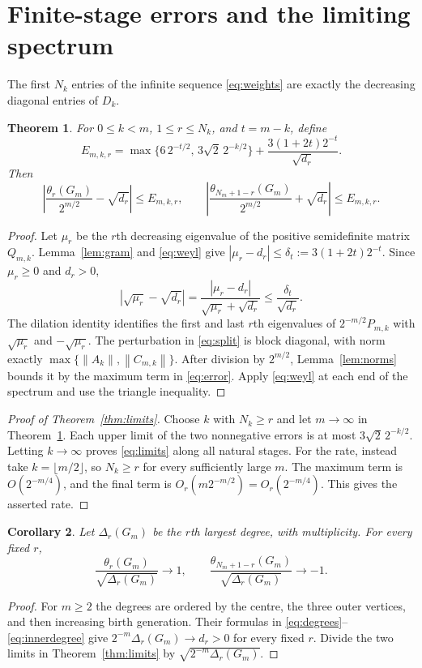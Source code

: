 \documentclass[11pt]{article}
\newtheorem{theorem}{Theorem}
\newtheorem{corollary}[theorem]{Corollary}
\newcommand{\norm}[1]{\left\lVert#1\right\rVert}
\begin{document}
\section{Finite-stage errors and the limiting spectrum}
The first $N_k$ entries of the infinite sequence \eqref{eq:weights}
are exactly the decreasing diagonal entries of $D_k$.

\begin{theorem}\label{thm:error}
For $0\le k<m$, $1\le r\le N_k$, and $t=m-k$, define
\begin{equation}\label{eq:error}
E_{m,k,r}=\max\{6\,2^{-t/2},\,3\sqrt2\,2^{-k/2}\}
+\frac{3(1+2t)2^{-t}}{\sqrt{d_r}}.
\end{equation}
Then
\[
\left|\frac{\theta_r(G_m)}{2^{m/2}}-\sqrt{d_r}\right|\le E_{m,k,r},
\qquad
\left|\frac{\theta_{N_m+1-r}(G_m)}{2^{m/2}}+\sqrt{d_r}\right|
\le E_{m,k,r}.
\]
\end{theorem}
\begin{proof}
Let $\mu_r$ be the $r$th decreasing eigenvalue of the positive
semidefinite matrix $Q_{m,k}$. Lemma~\ref{lem:gram} and
\eqref{eq:weyl} give
$|\mu_r-d_r|\le\delta_t:=3(1+2t)2^{-t}$.
Since $\mu_r\ge0$ and $d_r>0$,
\[
|\sqrt{\mu_r}-\sqrt{d_r}|
=\frac{|\mu_r-d_r|}{\sqrt{\mu_r}+\sqrt{d_r}}
\le\frac{\delta_t}{\sqrt{d_r}}.
\]
The dilation identity identifies the first and last $r$th eigenvalues
of $2^{-m/2}P_{m,k}$ with $\sqrt{\mu_r}$ and $-\sqrt{\mu_r}$.
The perturbation in \eqref{eq:split} is block diagonal, with norm
exactly $\max\{\norm{A_k},\norm{C_{m,k}}\}$.
After division by $2^{m/2}$, Lemma~\ref{lem:norms} bounds it by the
maximum term in \eqref{eq:error}. Apply \eqref{eq:weyl} at each
end of the spectrum and use the triangle inequality.
\end{proof}

\begin{proof}[Proof of Theorem~\ref{thm:limits}]
Choose $k$ with $N_k\ge r$ and let $m\to\infty$ in
Theorem~\ref{thm:error}. Each upper limit of the two nonnegative
errors is at most $3\sqrt2\,2^{-k/2}$. Letting $k\to\infty$
proves \eqref{eq:limits} along all natural stages.
For the rate, instead take $k=\lfloor m/2\rfloor$, so $N_k\ge r$
for every sufficiently large $m$. The maximum term is
$O(2^{-m/4})$, and the final term is
$O_r(m2^{-m/2})=O_r(2^{-m/4})$. This gives the asserted rate.
\end{proof}

\begin{corollary}\label{cor:degrees}
Let $\Delta_r(G_m)$ be the $r$th largest degree, with multiplicity.
For every fixed $r$,
\[
\frac{\theta_r(G_m)}{\sqrt{\Delta_r(G_m)}}\longrightarrow1,
\qquad
\frac{\theta_{N_m+1-r}(G_m)}{\sqrt{\Delta_r(G_m)}}\longrightarrow-1.
\]
\end{corollary}
\begin{proof}
For $m\ge2$ the degrees are ordered by the centre, the three outer
vertices, and then increasing birth generation. Their formulas in
\eqref{eq:degrees}--\eqref{eq:innerdegree} give
$2^{-m}\Delta_r(G_m)\to d_r>0$ for every fixed $r$.
Divide the two limits in Theorem~\ref{thm:limits} by
$\sqrt{2^{-m}\Delta_r(G_m)}$.
\end{proof}
\end{document}
